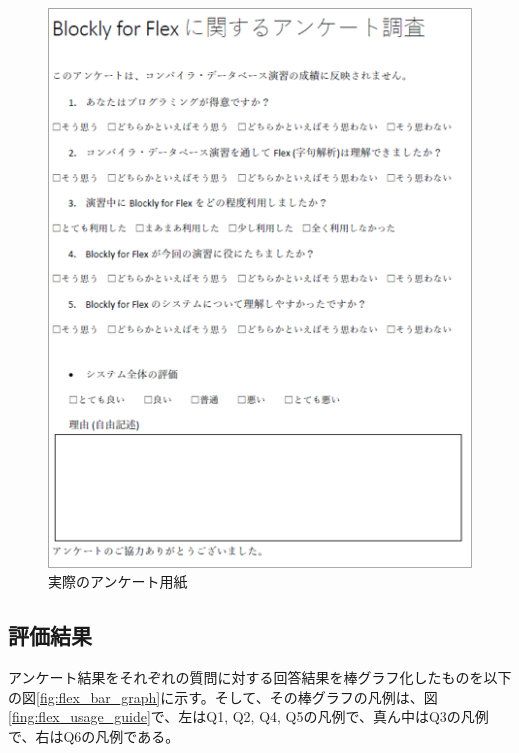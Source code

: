 \documentclass{risepaper}
\begin{document}
\begin{figure}[h]
\begin{center}
\includegraphics[scale=1.0]{img/questionnaire.PNG}
\caption{実際のアンケート用紙}%
\label{fig:questionnaire}
\end{center}%
\end{figure}%


   		\subsection{評価結果}

アンケート結果をそれぞれの質問に対する回答結果を棒グラフ化したものを以下の図\ref{fig:flex_bar_graph}に示す。そして、その棒グラフの凡例は、図\ref{fing:flex_usage_guide}で、左はQ1, Q2, Q4, Q5の凡例で、真ん中はQ3の凡例で、右はQ6の凡例である。
\end{document}
